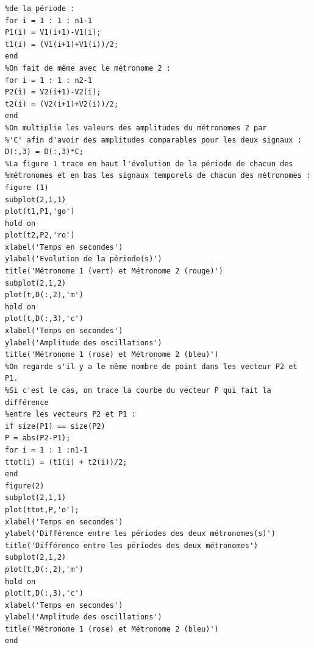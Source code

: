 \documentclass[a4paper,11pt]{report}
\begin{document}
\begin{verbatim}
%de la période :
for i = 1 : 1 : n1-1
P1(i) = V1(i+1)-V1(i);
t1(i) = (V1(i+1)+V1(i))/2;
end
%On fait de même avec le métronome 2 :
for i = 1 : 1 : n2-1
P2(i) = V2(i+1)-V2(i);
t2(i) = (V2(i+1)+V2(i))/2;
end
%On multiplie les valeurs des amplitudes du métronomes 2 par
%'C' afin d'avoir des amplitudes comparables pour les deux signaux :
D(:,3) = D(:,3)*C;
%La figure 1 trace en haut l'évolution de la période de chacun des
%métronomes et en bas les signaux temporels de chacun des métronomes :
figure (1)
subplot(2,1,1)
plot(t1,P1,'go')
hold on
plot(t2,P2,'ro')
xlabel('Temps en secondes')
ylabel('Evolution de la période(s)')
title('Métronome 1 (vert) et Métronome 2 (rouge)')
subplot(2,1,2)
plot(t,D(:,2),'m')
hold on
plot(t,D(:,3),'c')
xlabel('Temps en secondes')
ylabel('Amplitude des oscillations')
title('Métronome 1 (rose) et Métronome 2 (bleu)')
%On regarde s'il y a le même nombre de point dans les vecteur P2 et P1.
%Si c'est le cas, on trace la courbe du vecteur P qui fait la différence
%entre les vecteurs P2 et P1 :
if size(P1) == size(P2)
P = abs(P2-P1);
for i = 1 : 1 :n1-1
ttot(i) = (t1(i) + t2(i))/2;
end
figure(2)
subplot(2,1,1)
plot(ttot,P,'o');
xlabel('Temps en secondes')
ylabel('Différence entre les périodes des deux métronomes(s)')
title('Différence entre les périodes des deux métronomes')
subplot(2,1,2)
plot(t,D(:,2),'m')
hold on
plot(t,D(:,3),'c')
xlabel('Temps en secondes')
ylabel('Amplitude des oscillations')
title('Métronome 1 (rose) et Métronome 2 (bleu)')
end
\end{verbatim}
\end{document}
